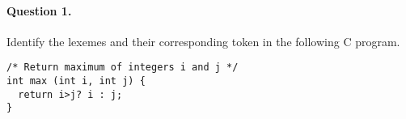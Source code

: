 \paragraph{Question 1.} Identify the lexemes and their corresponding
token in the following \textsf{C} program.
{\small
\begin{verbatim}
/* Return maximum of integers i and j */
int max (int i, int j) {
  return i>j? i : j;
}
\end{verbatim}
}
